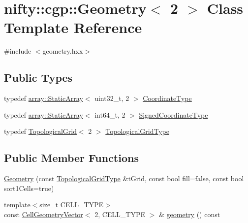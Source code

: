\hypertarget{classnifty_1_1cgp_1_1Geometry_3_012_01_4}{}\section{nifty\+:\+:cgp\+:\+:Geometry$<$ 2 $>$ Class Template Reference}
\label{classnifty_1_1cgp_1_1Geometry_3_012_01_4}


{\ttfamily \#include $<$geometry.\+hxx$>$}

\subsection*{Public Types}
\begin{DoxyCompactItemize}
\item 
typedef \hyperlink{namespacenifty_1_1array_a683f151f19c851754e0c6d55ed16a0c2}{array\+::\+Static\+Array}$<$ uint32\+\_\+t, 2 $>$ \hyperlink{classnifty_1_1cgp_1_1Geometry_3_012_01_4_ab8abca4eea1550f59dca20f28bd0304d}{Coordinate\+Type}
\item 
typedef \hyperlink{namespacenifty_1_1array_a683f151f19c851754e0c6d55ed16a0c2}{array\+::\+Static\+Array}$<$ int64\+\_\+t, 2 $>$ \hyperlink{classnifty_1_1cgp_1_1Geometry_3_012_01_4_a2a2413f5135f7b297a4f703cb5bcb641}{Signed\+Coordinate\+Type}
\item 
typedef \hyperlink{classnifty_1_1cgp_1_1TopologicalGrid}{Topological\+Grid}$<$ 2 $>$ \hyperlink{classnifty_1_1cgp_1_1Geometry_3_012_01_4_a6f4a07a376a645097547311fe0ad2836}{Topological\+Grid\+Type}
\end{DoxyCompactItemize}
\subsection*{Public Member Functions}
\begin{DoxyCompactItemize}
\item 
\hyperlink{classnifty_1_1cgp_1_1Geometry_3_012_01_4_a3fa2454e7e2c5a134441928d5907c9dd}{Geometry} (const \hyperlink{classnifty_1_1cgp_1_1Geometry_3_012_01_4_a6f4a07a376a645097547311fe0ad2836}{Topological\+Grid\+Type} \&t\+Grid, const bool fill=false, const bool sort1\+Cells=true)
\item 
{\footnotesize template$<$size\+\_\+t C\+E\+L\+L\+\_\+\+T\+Y\+P\+E$>$ }\\const \hyperlink{classnifty_1_1cgp_1_1CellGeometryVector}{Cell\+Geometry\+Vector}$<$ 2, C\+E\+L\+L\+\_\+\+T\+Y\+P\+E $>$ \& \hyperlink{classnifty_1_1cgp_1_1Geometry_3_012_01_4_a15068ce7226d0cce53c1c1f97a50c625}{geometry} () const 
\end{DoxyCompactItemize}


